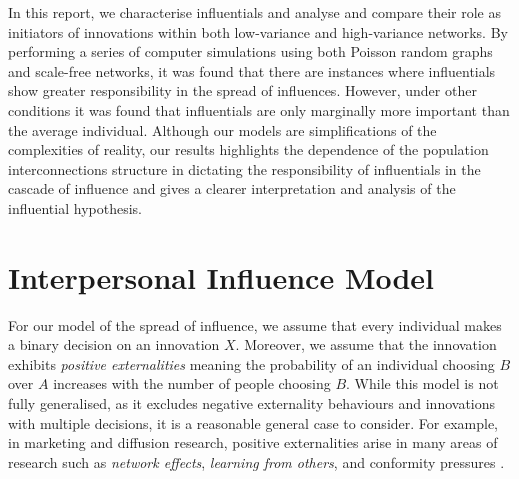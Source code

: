 \documentclass[10pt, oneside, reqno]{amsart}
\theoremstyle{plain}%
\theoremstyle{definition}
\theoremstyle{remark}
\begin{document}
In this report, we characterise influentials and analyse and compare their role as initiators of innovations within both low-variance and high-variance networks\cite{Influential}.
By performing a series of computer simulations using both Poisson random graphs and scale-free networks, it was found that 
there are instances where influentials show greater responsibility in the spread of influences.
However, under other conditions it was found that influentials are only marginally more important
than the average individual. 
Although our models are simplifications of the complexities of reality, our results highlights
the dependence of the population interconnections structure in dictating the responsibility of influentials in the cascade of influence and gives a clearer interpretation and analysis of the influential hypothesis.








\section{Interpersonal Influence Model}

For our model of the spread of influence, we assume that every individual makes a binary decision
on an innovation $X$. Moreover, we assume that the innovation exhibits \textit{positive externalities}
meaning the probability of an individual choosing $B$ over $A$ increases with the number of 
people choosing $B$. While this model is not fully generalised, as it excludes negative externality 
behaviours and innovations with multiple decisions, it is a reasonable general case to consider. 
For example, in marketing and diffusion research, positive externalities arise in many areas of 
research such as \textit{network effects}, \textit{learning from others}, and conformity 
pressures \cite{Influential}.
\end{document}
